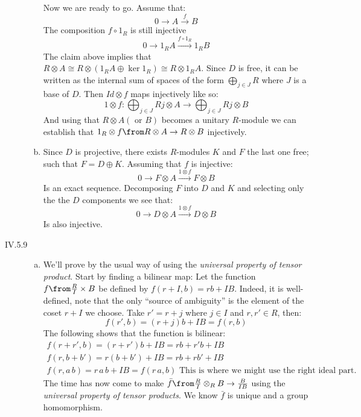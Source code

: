 \begin{description}
\begin{enumerate}[(a)]
            Now we are ready to go. Assume that:
            $$0\to A \xrightarrow{f} B$$
            The composition $f\circ 1_R$ is still injective
            $$0\to 1_RA \xrightarrow{f\circ 1_R} 1_RB$$
            The claim above implies that $R\otimes A\cong R\otimes(1_RA\oplus \ker 1_R)\cong R\otimes 1_R A$. Since $D$ is free, it can be written as the internal sum of spaces of the form $\bigoplus_{j\in J} R$ where $J$ is a base of $D$. Then $Id\otimes f$ maps injectively like so:
            $$1\otimes f : \bigoplus_{j\in J} Rj\otimes A \to \bigoplus_{j\in J} Rj\otimes B$$
            And using that $R\otimes A(\text{ or } B)$ becomes a unitary  $R$-module we can establish that $1_R\otimes f\from R\otimes A \to R\otimes B$ injectively.
        \item Since $D$ is projective, there exists $R$-modules $K$ and $F$ the last one free; such that $F= D\oplus K$. Assuming that $f$ is injective:
            $$0\to F\otimes A \xrightarrow{1\otimes f} F\otimes B$$
            Is an exact sequence. Decomposing $F$ into $D$ and $K$ and selecting only the the $D$ components we see that:
            $$0\to D\otimes A \xrightarrow{1\otimes f} D\otimes B$$
            Is also injective.
    \end{enumerate}
\item[IV.5.9]
    \begin{enumerate}[(a)]
        \item We'll prove by the usual way of using the \emph{universal property of tensor product}. Start by finding a bilinear map:
            Let the function $f\from \frac RI \times B$ be defined by $f(r+I,b) = rb + IB$. 
            Indeed, it is well-defined, note that the only ``source of ambiguity'' is the element of the coset $r+I$ we choose. Take $r'= r+j$ where $j\in I$ and $r,r'\in R$, then:
            $$f(r',b) = (r+j)b + IB = f(r,b)$$
            The following  shows that the function is bilinear:
            \begin{gather*}
                f(r+r',b) = (r+r')b +IB = rb+r'b +IB\\
                f(r,b+b') = r(b+b') +IB = rb+rb' +IB\\
                f(r,a\, b) = r\, a\, b +IB = f(r\, a, b) \text{ This is where we might use the right ideal part.}
            \end{gather*}
            The time has now come to make $\bar f \from \frac RI\otimes_R B \to \frac B{IB}$ using  the \emph{universal property of tensor products}. We know $\bar f$ is unique and a group homomorphism.


\end{enumerate}
\end{description}
